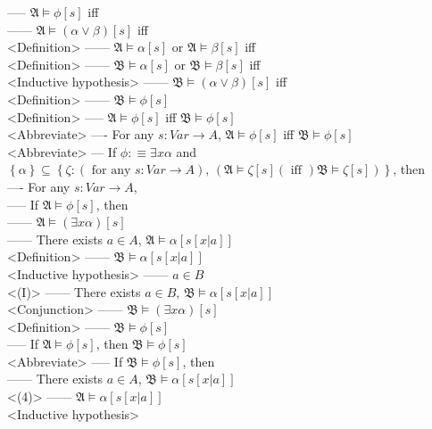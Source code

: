\documentclass{book}
\newcommand{\is}{:\equiv}
\newcommand{\txtiff}{\left(\text{ iff }\right)}
\newcommand{\txtforall}[2]{\left(\text{ for any }#1\right)\text{, }\left(#2\right)}
\newcommand{\set}[1]{\left\{ #1 \right\}}
\begin{document}
					----- $\mathfrak{A} \vDash \phi[s]$ iff \\
						------ $\mathfrak{A} \vDash (\alpha \lor \beta)[s]$ iff \\ <Definition>
						------ $\mathfrak{A} \vDash \alpha[s]$ or $\mathfrak{A} \vDash \beta[s]$ iff \\ <Definition>
						------ $\mathfrak{B} \vDash \alpha[s]$ or $\mathfrak{B} \vDash \beta[s]$ iff \\ <Inductive hypothesis>
						------ $\mathfrak{B} \vDash (\alpha \lor \beta)[s]$ iff \\ <Definition>
						------ $\mathfrak{B} \vDash \phi[s]$ \\ <Definition>
					----- $\mathfrak{A} \vDash \phi[s]$ iff $\mathfrak{B} \vDash \phi[s]$ \\ <Abbreviate>
				---- For any $s: Var \rightarrow A$, $\mathfrak{A} \vDash \phi[s]$ iff $\mathfrak{B} \vDash \phi[s]$ \\ <Abbreviate>
			--- If $\phi \is \exists x \alpha$ and $\set{\alpha}	\subseteq \set{\zeta: \txtforall{s: Var \rightarrow A}{\mathfrak{A} \vDash \zeta[s] \txtiff \mathfrak{B} \vDash \zeta[s]}}$, then \\
				---- For any $s: Var \rightarrow A$, \\
					----- If $\mathfrak{A} \vDash \phi[s]$, then \\
						------ $\mathfrak{A} \vDash (\exists x \alpha)[s]$ \\
						------ There exists $a \in A$, $\mathfrak{A} \vDash \alpha[s[x|a]]$ \\ <Definition>
						------ $\mathfrak{B} \vDash \alpha[s[x|a]]$ \\ <Inductive hypothesis>
						------ $a \in B$ \\ <(I)>
						------ There exists $a \in B$, $\mathfrak{B} \vDash \alpha[s[x|a]]$ \\ <Conjunction>
						------ $\mathfrak{B} \vDash (\exists x \alpha)[s]$ \\ <Definition>
						------ $\mathfrak{B} \vDash \phi[s]$ \\
					----- If $\mathfrak{A} \vDash \phi[s]$, then $\mathfrak{B} \vDash \phi[s]$ \\ <Abbreviate>
					----- If $\mathfrak{B} \vDash \phi[s]$, then \\
						------ There exists $a \in A$, $\mathfrak{B} \vDash \alpha[s[x|a]]$ \\ <(4)>
						------ $\mathfrak{A} \vDash \alpha[s[x|a]]$ \\ <Inductive hypothesis>
\end{document}
